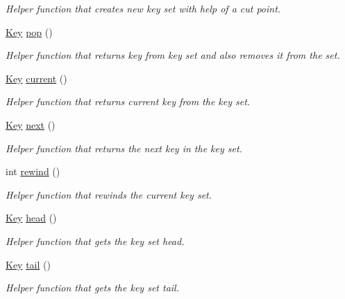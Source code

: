\begin{DoxyCompactItemize}
\begin{DoxyCompactList}\small\item\em Helper function that creates new key set with help of a cut point. \end{DoxyCompactList}\item 
\mbox{\hyperlink{classorg_1_1libelektra_1_1Key}{Key}} \mbox{\hyperlink{classorg_1_1libelektra_1_1KeySet_a6fcb652d72c64772bae40ec801d93ad9}{pop}} ()
\begin{DoxyCompactList}\small\item\em Helper function that returns key from key set and also removes it from the set. \end{DoxyCompactList}\item 
\mbox{\hyperlink{classorg_1_1libelektra_1_1Key}{Key}} \mbox{\hyperlink{classorg_1_1libelektra_1_1KeySet_a684ac5513b51d841cc04bdcdb203c4cf}{current}} ()
\begin{DoxyCompactList}\small\item\em Helper function that returns current key from the key set. \end{DoxyCompactList}\item 
\mbox{\hyperlink{classorg_1_1libelektra_1_1Key}{Key}} \mbox{\hyperlink{classorg_1_1libelektra_1_1KeySet_a92aa593320132e4272602dda29aee2c7}{next}} ()
\begin{DoxyCompactList}\small\item\em Helper function that returns the next key in the key set. \end{DoxyCompactList}\item 
int \mbox{\hyperlink{classorg_1_1libelektra_1_1KeySet_a20533a5e97b16b76b977b95be179d58c}{rewind}} ()
\begin{DoxyCompactList}\small\item\em Helper function that rewinds the current key set. \end{DoxyCompactList}\item 
\mbox{\hyperlink{classorg_1_1libelektra_1_1Key}{Key}} \mbox{\hyperlink{classorg_1_1libelektra_1_1KeySet_a11ba1ef1213a9f1ac5743491bc7154e5}{head}} ()
\begin{DoxyCompactList}\small\item\em Helper function that gets the key set head. \end{DoxyCompactList}\item 
\mbox{\hyperlink{classorg_1_1libelektra_1_1Key}{Key}} \mbox{\hyperlink{classorg_1_1libelektra_1_1KeySet_ab81aff6c88595b3f4c3307d1f996857f}{tail}} ()
\begin{DoxyCompactList}\small\item\em Helper function that gets the key set tail. \end{DoxyCompactList}\item 

\end{DoxyCompactItemize}
